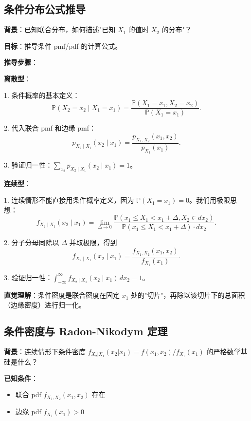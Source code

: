 \subsection{条件分布公式推导}\label{sec:derivation-ch2-conditional-distribution}

\textbf{背景}：已知联合分布，如何描述"已知 $X_1$ 的值时 $X_2$ 的分布"？

\textbf{目标}：推导条件 pmf/pdf 的计算公式。

\textbf{推导步骤}：

\textbf{离散型}：

1. 条件概率的基本定义：
\[
\mathbb{P}(X_2 = x_2 \mid X_1 = x_1) = \frac{\mathbb{P}(X_1 = x_1, X_2 = x_2)}{\mathbb{P}(X_1 = x_1)}.
\]

2. 代入联合 pmf 和边缘 pmf：
\[
p_{X_2 \mid X_1}(x_2 \mid x_1) = \frac{p_{X_1, X_2}(x_1, x_2)}{p_{X_1}(x_1)}.
\]

3. 验证归一性：$\sum_{x_2} p_{X_2 \mid X_1}(x_2 \mid x_1) = 1$。

\textbf{连续型}：

1. 连续情形不能直接用条件概率定义，因为 $\mathbb{P}(X_1 = x_1) = 0$。我们用极限思想：
\[
f_{X_2 \mid X_1}(x_2 \mid x_1) = \lim_{\Delta \to 0} \frac{\mathbb{P}(x_1 \leq X_1 < x_1 + \Delta, X_2 \in dx_2)}{\mathbb{P}(x_1 \leq X_1 < x_1 + \Delta) \cdot dx_2}.
\]

2. 分子分母同除以 $\Delta$ 并取极限，得到
\[
f_{X_2 \mid X_1}(x_2 \mid x_1) = \frac{f_{X_1, X_2}(x_1, x_2)}{f_{X_1}(x_1)}.
\]

3. 验证归一性：$\int_{-\infty}^{\infty} f_{X_2 \mid X_1}(x_2 \mid x_1) \, dx_2 = 1$。

\textbf{直觉理解}：条件密度是联合密度在固定 $x_1$ 处的"切片"，再除以该切片下的总面积（边缘密度）进行归一化。

\subsection{条件密度与 Radon-Nikodym 定理}\label{sec:derivation-ch2-conditional-density}

\textbf{背景}：连续情形下条件密度 $f_{X_2|X_1}(x_2|x_1) = f(x_1,x_2)/f_{X_1}(x_1)$ 的严格数学基础是什么？

\textbf{已知条件}：
\begin{itemize}
\item 联合 pdf $f_{X_1,X_2}(x_1,x_2)$ 存在
\item 边缘 pdf $f_{X_1}(x_1) > 0$
\end{itemize}

